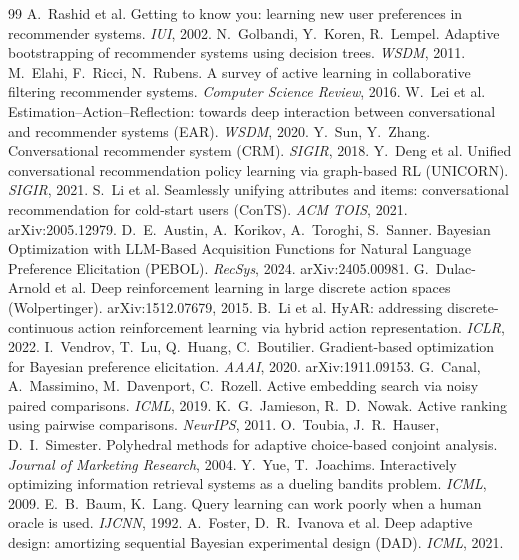\documentclass[11pt]{article}
\begin{document}
\begin{thebibliography}{99}
 A.~Rashid et al. Getting to know you: learning new user preferences in recommender systems. \emph{IUI}, 2002.
 N.~Golbandi, Y.~Koren, R.~Lempel. Adaptive bootstrapping of recommender systems using decision trees. \emph{WSDM}, 2011.
 M.~Elahi, F.~Ricci, N.~Rubens. A survey of active learning in collaborative filtering recommender systems. \emph{Computer Science Review}, 2016.
 W.~Lei et al. Estimation--Action--Reflection: towards deep interaction between conversational and recommender systems (EAR). \emph{WSDM}, 2020.
 Y.~Sun, Y.~Zhang. Conversational recommender system (CRM). \emph{SIGIR}, 2018.
 Y.~Deng et al. Unified conversational recommendation policy learning via graph-based RL (UNICORN). \emph{SIGIR}, 2021.
 S.~Li et al. Seamlessly unifying attributes and items: conversational recommendation for cold-start users (ConTS). \emph{ACM TOIS}, 2021. arXiv:2005.12979.
 D.~E.~Austin, A.~Korikov, A.~Toroghi, S.~Sanner. Bayesian Optimization with LLM-Based Acquisition Functions for Natural Language Preference Elicitation (PEBOL). \emph{RecSys}, 2024. arXiv:2405.00981.
 G.~Dulac-Arnold et al. Deep reinforcement learning in large discrete action spaces (Wolpertinger). arXiv:1512.07679, 2015.
 B.~Li et al. HyAR: addressing discrete-continuous action reinforcement learning via hybrid action representation. \emph{ICLR}, 2022.
 I.~Vendrov, T.~Lu, Q.~Huang, C.~Boutilier. Gradient-based optimization for Bayesian preference elicitation. \emph{AAAI}, 2020. arXiv:1911.09153.
 G.~Canal, A.~Massimino, M.~Davenport, C.~Rozell. Active embedding search via noisy paired comparisons. \emph{ICML}, 2019.
 K.~G.~Jamieson, R.~D.~Nowak. Active ranking using pairwise comparisons. \emph{NeurIPS}, 2011.
 O.~Toubia, J.~R.~Hauser, D.~I.~Simester. Polyhedral methods for adaptive choice-based conjoint analysis. \emph{Journal of Marketing Research}, 2004.
 Y.~Yue, T.~Joachims. Interactively optimizing information retrieval systems as a dueling bandits problem. \emph{ICML}, 2009.
 E.~B.~Baum, K.~Lang. Query learning can work poorly when a human oracle is used. \emph{IJCNN}, 1992.
 A.~Foster, D.~R.~Ivanova et al. Deep adaptive design: amortizing sequential Bayesian experimental design (DAD). \emph{ICML}, 2021.

\end{thebibliography}
\end{document}
